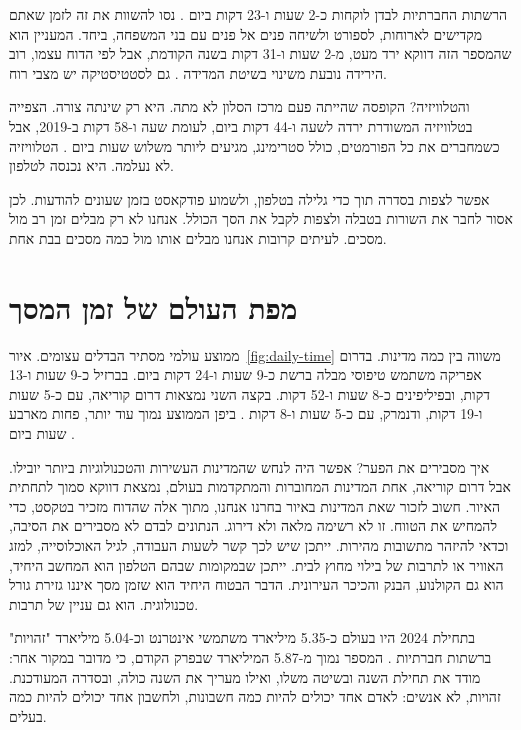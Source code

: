 הרשתות החברתיות לבדן לוקחות כ-2 שעות ו-23 דקות ביום \parencite{kemp2024}. נסו להשוות את זה לזמן שאתם מקדישים לארוחות, לספורט ולשיחה פנים אל פנים עם בני המשפחה, ביחד. המעניין הוא שהמספר הזה דווקא ירד מעט, מ-2 שעות ו-31 דקות בשנה הקודמת, אבל לפי הדוח עצמו, רוב הירידה נובעת משינוי בשיטת המדידה \parencite{kemp2024}. גם לסטטיסטיקה יש מצבי רוח.

והטלוויזיה? הקופסה שהייתה פעם מרכז הסלון לא מתה. היא רק שינתה צורה. הצפייה בטלוויזיה המשודרת ירדה לשעה ו-44 דקות ביום, לעומת שעה ו-58 דקות ב-2019, אבל כשמחברים את כל הפורמטים, כולל סטרימינג, מגיעים ליותר משלוש שעות ביום \parencite{kemp2024}. הטלוויזיה לא נעלמה. היא נכנסה לטלפון.

\begin{alertbox}
אפשר לצפות בסדרה תוך כדי גלילה בטלפון, ולשמוע פודקאסט בזמן שעונים להודעות. לכן אסור לחבר את השורות בטבלה ולצפות לקבל את הסך הכולל. אנחנו לא רק מבלים זמן רב מול מסכים. לעיתים קרובות אנחנו מבלים אותו מול כמה מסכים בבת אחת.
\end{alertbox}

\section{מפת העולם של זמן המסך}

ממוצע עולמי מסתיר הבדלים עצומים. איור~\ref{fig:daily-time} משווה בין כמה מדינות. בדרום אפריקה משתמש טיפוסי מבלה ברשת כ-9 שעות ו-24 דקות ביום. בברזיל כ-9 שעות ו-13 דקות, ובפיליפינים כ-8 שעות ו-52 דקות. בקצה השני נמצאות דרום קוריאה, עם כ-5 שעות ו-19 דקות, ודנמרק, עם כ-5 שעות ו-8 דקות \parencite{kemp2024}. ביפן הממוצע נמוך עוד יותר, פחות מארבע שעות ביום \parencite{kemp2024}.



איך מסבירים את הפער? אפשר היה לנחש שהמדינות העשירות והטכנולוגיות ביותר יובילו. אבל דרום קוריאה, אחת המדינות המחוברות והמתקדמות בעולם, נמצאת דווקא סמוך לתחתית האיור. חשוב לזכור שאת המדינות באיור בחרנו אנחנו, מתוך אלה שהדוח מזכיר בטקסט, כדי להמחיש את הטווח. זו לא רשימה מלאה ולא דירוג. הנתונים לבדם לא מסבירים את הסיבה, וכדאי להיזהר מתשובות מהירות. ייתכן שיש לכך קשר לשעות העבודה, לגיל האוכלוסייה, למזג האוויר או לתרבות של בילוי מחוץ לבית. ייתכן שבמקומות שבהם הטלפון הוא המחשב היחיד, הוא גם הקולנוע, הבנק והכיכר העירונית. הדבר הבטוח היחיד הוא שזמן מסך איננו גזירת גורל טכנולוגית. הוא גם עניין של תרבות.

\begin{factbox}
בתחילת \num{2024} היו בעולם כ-\num{5.35} מיליארד משתמשי אינטרנט וכ-\num{5.04} מיליארד "זהויות" ברשתות חברתיות \parencite{kemp2024}. המספר נמוך מ-\num{5.87} המיליארד שבפרק הקודם, כי מדובר במקור אחר:  מודד את תחילת השנה ובשיטה משלו, ואילו  מעריך את השנה כולה, ובסדרה המעודכנת. זהויות, לא אנשים: לאדם אחד יכולים להיות כמה חשבונות, ולחשבון אחד יכולים להיות כמה בעלים.
\end{factbox}

